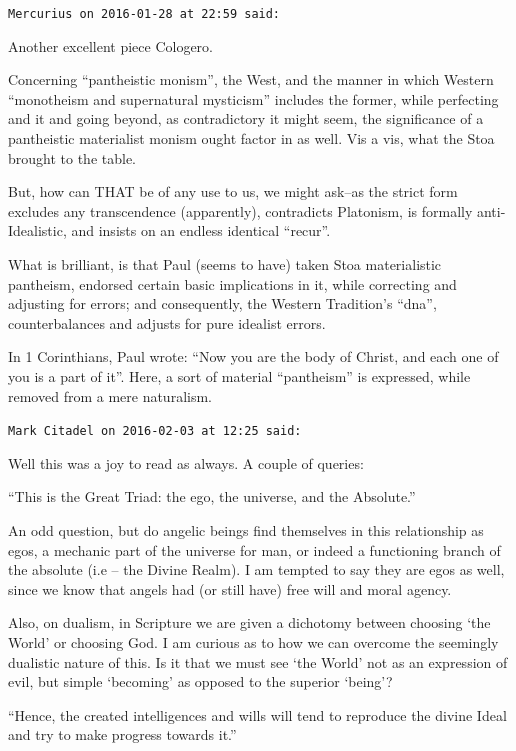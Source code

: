 \begin{footnotesize}
\begin{sffamily}
\texttt{Mercurius on 2016-01-28 at 22:59 said:}

Another excellent piece Cologero.

Concerning ``pantheistic monism'', the West, and the manner in which Western ``monotheism and supernatural mysticism'' includes the former, while perfecting and it and going beyond, as contradictory it might seem, the significance of a pantheistic materialist monism ought factor in as well. Vis a vis, what the Stoa brought to the table.

But, how can THAT be of any use to us, we might ask--as the strict form excludes any transcendence (apparently), contradicts Platonism, is formally anti-Idealistic, and insists on an endless identical ``recur''.

What is brilliant, is that Paul (seems to have) taken Stoa materialistic pantheism, endorsed certain basic implications in it, while correcting and adjusting for errors; and consequently, the Western Tradition's ``dna'', counterbalances and adjusts for pure idealist errors.

In 1 Corinthians, Paul wrote: ``Now you are the body of Christ, and each one of you is a part of it''. Here, a sort of material ``pantheism'' is expressed, while removed from a mere naturalism.

\hfill

\texttt{Mark Citadel on 2016-02-03 at 12:25 said:}

Well this was a joy to read as always. A couple of queries:

``This is the Great Triad: the ego, the universe, and the Absolute.''

An odd question, but do angelic beings find themselves in this relationship as egos, a mechanic part of the universe for man, or indeed a functioning branch of the absolute (i.e -- the Divine Realm). I am tempted to say they are egos as well, since we know that angels had (or still have) free will and moral agency.

Also, on dualism, in Scripture we are given a dichotomy between choosing `the World' or choosing God. I am curious as to how we can overcome the seemingly dualistic nature of this. Is it that we must see `the World' not as an expression of evil, but simple `becoming' as opposed to the superior `being'?

``Hence, the created intelligences and wills will tend to reproduce the divine Ideal and try to make progress towards it.''


\end{sffamily}
\end{footnotesize}
